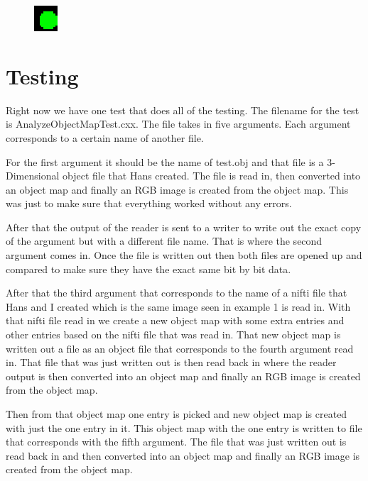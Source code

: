 \documentclass{InsightArticle}
\begin{document}
\begin{itemize}
\begin{figure}[h]
\center
\includegraphics[width=.14\textwidth]{circle.eps}
\label{fig:StreamingConceptDiagram}
\end{figure}


\end{itemize}

\section{Testing}

Right now we have one test that does all of the testing.  The filename for the test is AnalyzeObjectMapTest.cxx.  The file takes in five arguments.
Each argument corresponds to a certain name of another file.  

For the first argument it should be the name of test.obj and that file is a 3-Dimensional object file that Hans created.  The file is read in, then converted into an object map and finally an RGB image is created from the object map.  This was just to make sure that everything worked without any errors.  

After that the output of the reader is sent to a writer to write out the exact copy of the argument but with a different file name.  That is where the second argument comes in.  Once the file is written out then both files are opened up and compared to make sure they have the exact same bit by bit data.  

After that the third argument that corresponds to the name of a nifti file that Hans and I created which is the same image seen in example 1 is read in.  With that nifti file read in we create a new object map with some extra entries and other entries based on the nifti file that was read in.  That new object map is written out a file as an object file that corresponds to the fourth argument read in.  That file that was just written out is then read back in where the reader output is then converted into an object map and finally an RGB image is created from the object map.  

Then from that object map one entry is picked and new object map is created with just the one entry in it.  This object map with the one entry is written to file that corresponds with the fifth argument.  The file that was just written out is read back in and then converted into an object map and finally an RGB image is created from the object map.



%
%



\end{document}
